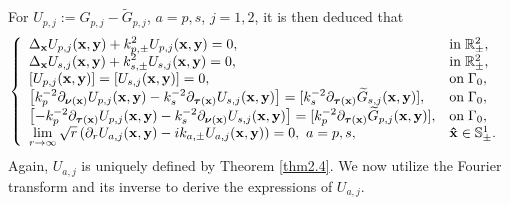 \documentclass[final,reqno]{siamltex}
\newcommand{\pa}{\partial}
\newcommand{\wid}{\widetilde}
\newcommand{\mat}{\mathbb}
\newcommand{\R}{{\mat R}}
\newcommand{\Sp}{{\mat S}}
\newcommand{\be}{\begin{eqnarray}}
\newcommand{\en}{\end{eqnarray}}
\begin{document}
For $U_{p,j}:=G_{p,j}-\wid G_{p,j}$, $a=p,s$, $j=1,2$, it is then deduced that 
\be\label{3.4}
\left\{
\begin{array}{ll}
	\displaystyle\Delta_\mathbf{x}U_{p,j}(\mathbf{x},\mathbf{y})+k_{p,\pm}^2U_{p,j}(\mathbf{x},\mathbf{y})=0,&{\rm in}\;\R^2_\pm,~ \\ 
	\displaystyle\Delta_\mathbf{x}U_{s,j}(\mathbf{x},\mathbf{y})+k_{s,\pm}^2U_{s,j}(\mathbf{x},\mathbf{y})=0,&{\rm in}\;\R^2_\pm,~ \\
	\left[U_{p,j}(\mathbf{x},\mathbf{y})\right]=\left[U_{s,j}(\mathbf{x},\mathbf{y})\right]=0,&{\rm on}\;\Gamma_0,~ \\
	\displaystyle\left[k_p^{-2}\pa_{\boldsymbol{\nu}(\mathbf{x})}U_{p,j}(\mathbf{x},\mathbf{y})-k_s^{-2}\pa_{\boldsymbol{\tau}(\mathbf{x})}U_{s,j}(\mathbf{x},\mathbf{y})\right]=[k_{s}^{-2}\pa_{\boldsymbol{\tau}(\mathbf{x})}\wid G_{s,j}(\mathbf{x},\mathbf{y})],&{\rm on}\;\Gamma_0,~ \\
	\displaystyle\left[-k_p^{-2}\pa_{\boldsymbol{\tau}(\mathbf{x})}U_{p,j}(\mathbf{x},\mathbf{y})-k_s^{-2}\pa_{\boldsymbol{\nu}(\mathbf{x})}U_{s,j}(\mathbf{x},\mathbf{y})\right]=[k_{p}^{-2}\pa_{\boldsymbol{\tau}(\mathbf{x})}\wid G_{p,j}(\mathbf{x},\mathbf{y})],&{\rm on}\;\Gamma_0,~ \\
	\lim\limits_{r\rightarrow\infty}\sqrt{r}\left(\pa_rU_{a,j}(\mathbf{x},\mathbf{y})-ik_{a,\pm}U_{a,j}(\mathbf{x},\mathbf{y})\right)=0,~a=p,s,&\mathbf{\hat x}\in\Sp^1_\pm.~ 
\end{array}
\right.
\en
Again, $U_{a,j}$ is uniquely defined by Theorem \ref{thm2.4}. We now utilize the Fourier transform and its inverse to derive the expressions of $U_{a,j}$. 
\end{document}
